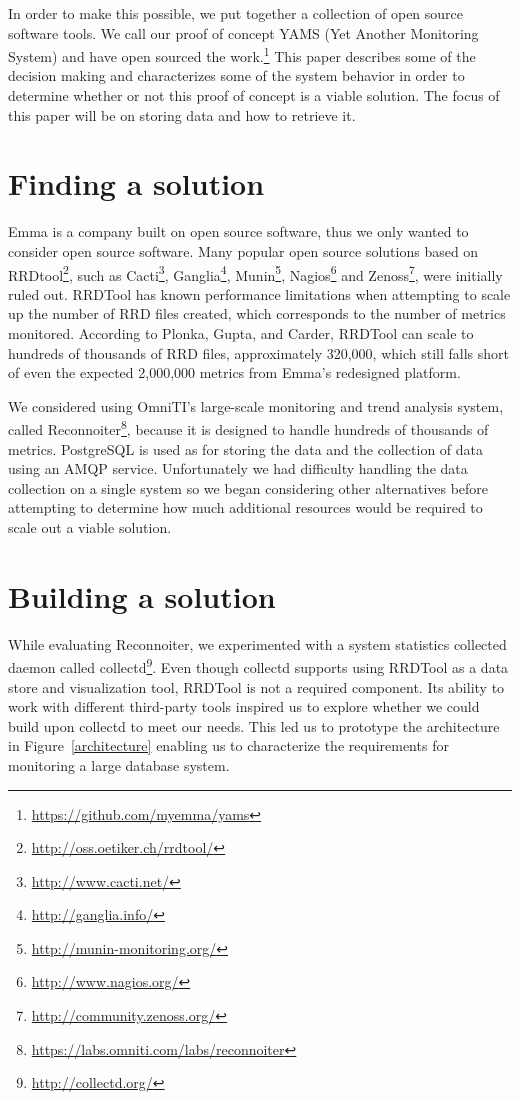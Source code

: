 \documentclass[twocolumn,letterpaper]{article}
\begin{document}
In order to make this possible, we put together a collection of open source
software tools.  We call our proof of concept YAMS (Yet Another
Monitoring System) and have open sourced the
work.\footnote{\url{https://github.com/myemma/yams}}  This paper describes
some of the decision making and characterizes some of the system behavior in
order to determine whether or not this proof of concept is a viable solution.
The focus of this paper will be on storing data and how to retrieve it.

\section{Finding a solution}

Emma is a company built on open source software, thus we only wanted to
consider open source software.  Many popular open source solutions based on
RRDtool\footnote{\url{http://oss.oetiker.ch/rrdtool/}}, such as
Cacti\footnote{\url{http://www.cacti.net/}},
Ganglia\footnote{\url{http://ganglia.info/}},
Munin\footnote{\url{http://munin-monitoring.org/}},
Nagios\footnote{\url{http://www.nagios.org/}} and
Zenoss\footnote{\url{http://community.zenoss.org/}}, were initially ruled out.
RRDTool has known performance limitations when attempting to scale up the
number of RRD files created, which corresponds to the number of metrics
monitored.\cite{Plonka07}  According to Plonka, Gupta, and Carder, RRDTool can
scale to hundreds of thousands of RRD files, approximately 320,000, which still
falls short of even the expected 2,000,000 metrics from Emma's redesigned
platform.

We considered using OmniTI's large-scale monitoring and trend analysis system,
called Reconnoiter\footnote{\url{https://labs.omniti.com/labs/reconnoiter}},
because it is designed to handle hundreds of thousands of metrics.  PostgreSQL
is used as for storing the data and the collection of data using an AMQP
service.  Unfortunately we had difficulty handling the data collection on a
single system so we began considering other alternatives before attempting to
determine how much additional resources would be required to scale out a viable
solution.

\section{Building a solution}

While evaluating Reconnoiter, we experimented with a system statistics
collected daemon called collectd\footnote{\url{http://collectd.org/}}.  Even
though collectd supports using RRDTool as a data store and visualization tool,
RRDTool is not a required component.  Its ability to work with different
third-party tools inspired us to explore whether we could build upon collectd
to meet our needs.  This led us to prototype the architecture in
Figure~\ref{architecture} enabling us to characterize the requirements for
monitoring a large database system.
\end{document}
